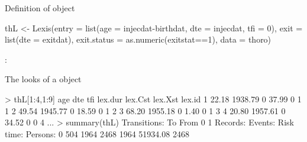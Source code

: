 \begin{frame}[fragile]{Definition of  object}
 \small
 \vspace*{-1em}
\renewcommand{\baselinestretch}{0.9}
\begin{semiverbatim}
thL <- Lexis(\alert<2>{entry = list(age = injecdat-birthdat,
                          \alert<5->{dte = injecdat},
                          tfi = 0)},
              \alert<3>{exit = list(\alert<5->{dte = exitdat})},
       exit.status = as.numeric(exitstat==1),
              data = thoro)
\end{semiverbatim}
\renewcommand{\baselinestretch}{1.0}
\normalsize
{} : 

\end{frame}

\begin{frame}[fragile]{The looks of a  object}
\small
\renewcommand{\baselinestretch}{0.9}
\begin{semiverbatim}
> thL[1:4,1:9]
    age     dte tfi \alert<3>{lex.dur} \alert<5>{lex.Cst} \alert<4>{lex.Xst} lex.id
1 22.18 1938.79   0 \alert<3>{  37.99} \alert<5>{      0} \alert<4>{      1}      1
2 49.54 1945.77   0 \alert<3>{  18.59} \alert<5>{      0} \alert<4>{      1}      2
3 68.20 1955.18   0 \alert<3>{   1.40} \alert<5>{      0} \alert<4>{      1}      3
4 20.80 1957.61   0 \alert<3>{  34.52} \alert<5>{      0} \alert<4>{      0}      4
...
\pause
> summary(thL)
Transitions:
     \alert<4>{To}
\alert<5>{From} \alert<4>{  0    1} Records:  \alert<4>{Events:}  \alert<3>{Risk time:}  Persons:
\alert<5>{   0} \alert<4>{504 1964}     2468  \alert<4>{   1964}  \alert<3>{  51934.08}      2468
\end{semiverbatim}
\renewcommand{\baselinestretch}{1.0}
\end{frame}

